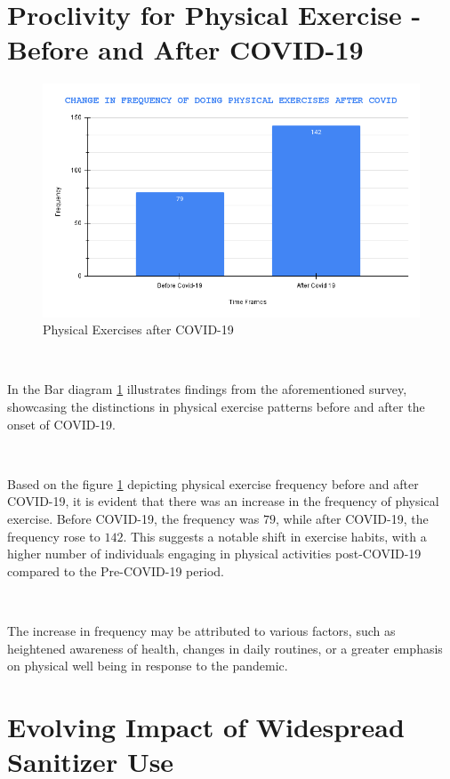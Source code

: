 \section{Proclivity for Physical Exercise - Before and After COVID-19}

\begin{figure}[h!]
	\centering
	\includegraphics[width=0.9\linewidth]{IMAGES/Image 35.png}
	\caption{Physical Exercises after COVID-19}
	\label{G35}
\end{figure}

\ 

In the Bar diagram \ref{G35} illustrates findings from the aforementioned survey, showcasing the distinctions in physical exercise patterns before and after the onset of COVID-19. 

\

Based on the figure \ref{G35} depicting physical exercise frequency before and after COVID-19, it is evident that there was an increase in the frequency of physical exercise. Before COVID-19, the frequency was $79$, while after COVID-19, the frequency rose to $142$. This suggests a notable shift in exercise habits, with a higher number of individuals engaging in physical activities post-COVID-19 compared to the Pre-COVID-19 period. 

\

The increase in frequency may be attributed to various factors, such as heightened awareness of health, changes in daily routines, or a greater emphasis on physical well
being in response to the pandemic. 

\section{Evolving Impact of Widespread Sanitizer Use}

